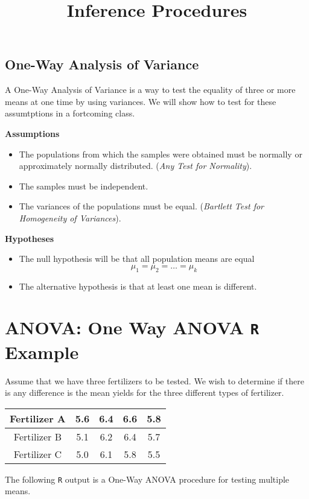 \documentclass[12pt]{article}
\title{Inference Procedures}
\begin{document}
	
	\subsection*{One-Way Analysis of Variance}
	A One-Way Analysis of Variance is a way to test the equality of three or more means at one time by using variances. We will show how to test for these assumtptions in a fortcoming class.
	
	\begin{framed}
	\noindent \textbf{Assumptions}
	
	\begin{itemize}
		\item The populations from which the samples were obtained must be normally or approximately normally distributed. (\textit{Any Test for Normality}).
		\item The samples must be independent.
		\item The variances of the populations must be equal. (\textit{Bartlett Test for Homogeneity of Variances}).
	\end{itemize}
	\end{framed}
	
\noindent	\textbf{Hypotheses}
	\begin{itemize}
\item The null hypothesis will be that all population means are equal
\[\mu_1 =\mu_2 = \ldots = \mu_k\]
\item The alternative hypothesis is that at least one mean is different.
	\end{itemize}

\newpage	
	\section*{ANOVA: One Way ANOVA \texttt{R} Example }
	
	Assume that we have three fertilizers to be tested. We wish to determine if there is any difference is the mean yields for the three different types of fertilizer.
	\begin{center}
		\begin{tabular}{|c|c|c|c|c|}
			\hline
			Fertilizer	A	&	5.6	&	6.4	&	6.6	&	5.8	\\ \hline
			Fertilizer	B	&	5.1	&	6.2	&	6.4	&	5.7	\\ \hline
			Fertilizer	C	&	5.0	&	6.1	&	5.8	&	5.5	\\ \hline
		\end{tabular} 
	\end{center}
	The following \texttt{R} output is a One-Way ANOVA procedure for testing multiple means.
	
\end{document}
